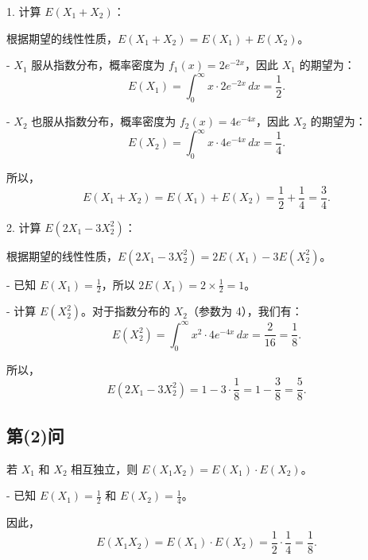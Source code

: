 \documentclass[twoside]{article}
\begin{document}
\begin{ans}{14}{14}

    1. 计算 \( E(X_1 + X_2) \)：

    根据期望的线性性质，\( E(X_1 + X_2) = E(X_1) + E(X_2) \)。
 
    - \( X_1 \) 服从指数分布，概率密度为 \( f_1(x) = 2e^{-2x} \)，因此 \( X_1 \) 的期望为：
      \[
      E(X_1) = \int_0^{\infty} x \cdot 2e^{-2x} \, dx = \frac{1}{2}.
      \]
 
    - \( X_2 \) 也服从指数分布，概率密度为 \( f_2(x) = 4e^{-4x} \)，因此 \( X_2 \) 的期望为：
      \[
      E(X_2) = \int_0^{\infty} x \cdot 4e^{-4x} \, dx = \frac{1}{4}.
      \]
 
    所以，
    \[
    E(X_1 + X_2) = E(X_1) + E(X_2) = \frac{1}{2} + \frac{1}{4} = \frac{3}{4}.
    \]
 
 2. 计算 \( E(2X_1 - 3X_2^2) \)：
 
    根据期望的线性性质，\( E(2X_1 - 3X_2^2) = 2E(X_1) - 3E(X_2^2) \)。
 
    - 已知 \( E(X_1) = \frac{1}{2} \)，所以 \( 2E(X_1) = 2 \times \frac{1}{2} = 1 \)。
    
    - 计算 \( E(X_2^2) \)。对于指数分布的 \( X_2 \)（参数为 4），我们有：
      \[
      E(X_2^2) = \int_0^{\infty} x^2 \cdot 4e^{-4x} \, dx = \frac{2}{16} = \frac{1}{8}.
      \]
 
    所以，
    \[
    E(2X_1 - 3X_2^2) = 1 - 3 \cdot \frac{1}{8} = 1 - \frac{3}{8} = \frac{5}{8}.
    \]
 
 \subsection*{第(2)问}
 
 若 \( X_1 \) 和 \( X_2 \) 相互独立，则 \( E(X_1 X_2) = E(X_1) \cdot E(X_2) \)。
 
 - 已知 \( E(X_1) = \frac{1}{2} \) 和 \( E(X_2) = \frac{1}{4} \)。
 
 因此，
 \[
 E(X_1 X_2) = E(X_1) \cdot E(X_2) = \frac{1}{2} \cdot \frac{1}{4} = \frac{1}{8}.
 \]

\end{ans}
\end{document}
